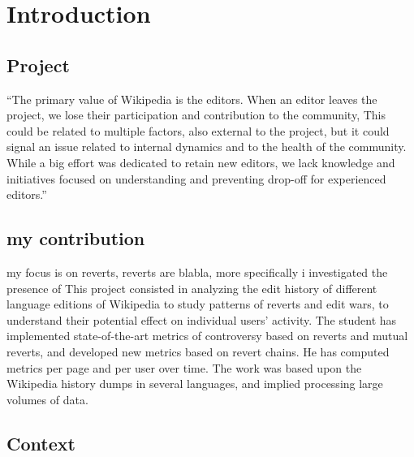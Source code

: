 \chapter{Introduction}
\label{cha:intro}


\section{Project}
\label{sec:project}
“The primary value of Wikipedia is the editors. When an editor leaves the project, we lose their participation and contribution to the community, This could be related to multiple factors, also external to the project, but it could signal an issue related to internal dynamics and to the health of the community. While a big effort was dedicated to retain new editors, we lack knowledge and initiatives focused on understanding and preventing drop-off for experienced editors.”
\section{my contribution }
\label{sec:project}
my focus is on reverts, reverts are blabla, 
more specifically i investigated the presence of 
This project consisted in analyzing the edit history of different language editions of Wikipedia to study patterns of reverts and edit wars, to understand their potential effect on individual users’ activity.
The student has implemented state-of-the-art metrics of controversy based on reverts and mutual reverts, and developed new metrics based on revert chains. He has computed metrics per page and per user over time.
The work was based upon the Wikipedia history dumps in several languages, and implied processing large volumes of data.

\section{Context}
\label{sec:context}
\cite{pippo}